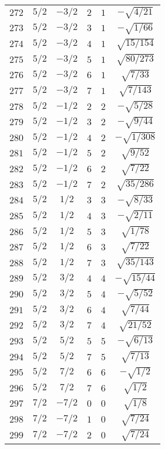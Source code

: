 \begin{table}
\begin{center}
\begin{tabular}{|c|c|c|c|c|c|}
$272$ & $5/2$ & $-3/2$ & $2$ & $1$ & $-\sqrt{4/21}$ \\ 
$273$ & $5/2$ & $-3/2$ & $3$ & $1$ & $-\sqrt{1/66}$ \\ 
$274$ & $5/2$ & $-3/2$ & $4$ & $1$ & $\sqrt{15/154}$ \\ 
$275$ & $5/2$ & $-3/2$ & $5$ & $1$ & $\sqrt{80/273}$ \\ 
$276$ & $5/2$ & $-3/2$ & $6$ & $1$ & $\sqrt{7/33}$ \\ 
$277$ & $5/2$ & $-3/2$ & $7$ & $1$ & $\sqrt{7/143}$ \\ 
$278$ & $5/2$ & $-1/2$ & $2$ & $2$ & $-\sqrt{5/28}$ \\ 
$279$ & $5/2$ & $-1/2$ & $3$ & $2$ & $-\sqrt{9/44}$ \\ 
$280$ & $5/2$ & $-1/2$ & $4$ & $2$ & $-\sqrt{1/308}$ \\ 
$281$ & $5/2$ & $-1/2$ & $5$ & $2$ & $\sqrt{9/52}$ \\ 
$282$ & $5/2$ & $-1/2$ & $6$ & $2$ & $\sqrt{7/22}$ \\ 
$283$ & $5/2$ & $-1/2$ & $7$ & $2$ & $\sqrt{35/286}$ \\ 
$284$ & $5/2$ & $1/2$ & $3$ & $3$ & $-\sqrt{8/33}$ \\ 
$285$ & $5/2$ & $1/2$ & $4$ & $3$ & $-\sqrt{2/11}$ \\ 
$286$ & $5/2$ & $1/2$ & $5$ & $3$ & $\sqrt{1/78}$ \\ 
$287$ & $5/2$ & $1/2$ & $6$ & $3$ & $\sqrt{7/22}$ \\ 
$288$ & $5/2$ & $1/2$ & $7$ & $3$ & $\sqrt{35/143}$ \\ 
$289$ & $5/2$ & $3/2$ & $4$ & $4$ & $-\sqrt{15/44}$ \\ 
$290$ & $5/2$ & $3/2$ & $5$ & $4$ & $-\sqrt{5/52}$ \\ 
$291$ & $5/2$ & $3/2$ & $6$ & $4$ & $\sqrt{7/44}$ \\ 
$292$ & $5/2$ & $3/2$ & $7$ & $4$ & $\sqrt{21/52}$ \\ 
$293$ & $5/2$ & $5/2$ & $5$ & $5$ & $-\sqrt{6/13}$ \\ 
$294$ & $5/2$ & $5/2$ & $7$ & $5$ & $\sqrt{7/13}$ \\ 
$295$ & $5/2$ & $7/2$ & $6$ & $6$ & $-\sqrt{1/2}$ \\ 
$296$ & $5/2$ & $7/2$ & $7$ & $6$ & $\sqrt{1/2}$ \\ 
$297$ & $7/2$ & $-7/2$ & $0$ & $0$ & $\sqrt{1/8}$ \\ 
$298$ & $7/2$ & $-7/2$ & $1$ & $0$ & $\sqrt{7/24}$ \\ 
$299$ & $7/2$ & $-7/2$ & $2$ & $0$ & $\sqrt{7/24}$ \\ 

\end{tabular}
\end{center}
\end{table}
